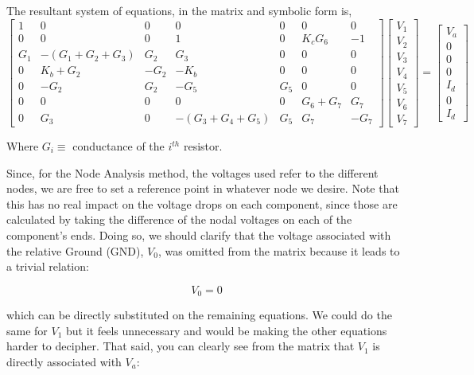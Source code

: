 The resultant system of equations, in the matrix and symbolic form is,\\
\begin{equation}
\begin{bmatrix}
1 & 0 & 0 & 0 & 0 & 0 & 0 \\
0 & 0 & 0  & 1 & 0 & K_cG_6 & -1 \\
G_1 & -(G_1+G_2+G_3) & G_2 & G_3 & 0 & 0 & 0  \\
0 & K_b+G_2 & -G_2 & -K_b & 0 & 0 & 0 \\
0 & -G_2 & G_2 & -G_5 & G_5 & 0 & 0 \\
0 & 0 & 0 & 0 & 0 & G_6+G_7 & G_7 \\
0 & G_3 & 0 & -(G_3+G_4+G_5) & G_5 & G_7 & -G_7
\end{bmatrix}
\begin{bmatrix}
V_1 \\
V_2 \\
V_3 \\
V_4 \\
V_5 \\
V_6 \\
V_7 
\end{bmatrix}
=
\begin{bmatrix}
V_a \\
0 \\
0 \\
0 \\ 
I_d \\
0 \\
I_d 
\end{bmatrix}
\end{equation}

Where $G_i\equiv $ conductance of the $i^{th}$ resistor.

\vspace{0.75cm}

Since, for the Node Analysis method, the voltages used refer to the different nodes, we are free to set a reference point in whatever node we desire. Note that this has no real impact on the voltage drops on each component, since those are calculated by taking the difference of the nodal voltages on each of the component's ends. Doing so, we should clarify that the voltage associated with the relative Ground (GND), $V_0$, was omitted from the matrix because it leads to a trivial relation: 

\begin{equation}
  V_0 = 0  
\end{equation}

\noindent which can be directly substituted on the remaining equations. We could do the same for $V_1$ but it feels unnecessary and would be making the other equations harder to decipher. That said, you can clearly see from the matrix that $V_1$ is directly associated with $V_a$:

